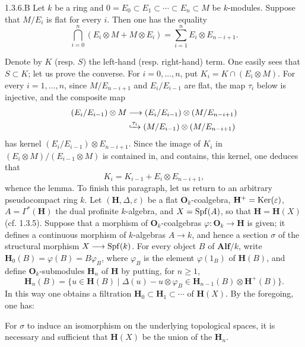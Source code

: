 \begin{lemma}{1.3.6.B}\label{VIIB.1.3.6.B}
Let $k$ be a ring and $0=E_0\subset E_1\subset\cdots\subset E_n\subset M$ be $k$-modules. Suppose that $M/E_i$ is flat for every $i$. Then one has the equality
\[
\bigcap_{i=0}^n(E_i\otimes M+M\otimes E_i)=\sum_{i=1}^n E_i\otimes E_{n-i+1}.
\]
\end{lemma}
Denote by $K$ (resp. $S$) the left-hand (resp. right-hand) term. One easily sees that $S\subset K$; let us prove the converse. For $i=0,\ldots,n$, put $K_i=K\cap(E_i\otimes M)$. For every $i=1,\ldots,n$, since $M/E_{n-i+1}$ and $E_i/E_{i-1}$ are flat, the map $\tau_i$ below is injective, and the composite map
\[
\begin{aligned}
(E_i/E_{i-1})\otimes M&\to(E_i/E_{i-1})\otimes(M/E_{n-i+1})\\
&\lhook\joinrel\xrightarrow{\tau_i}(M/E_{i-1})\otimes(M/E_{n-i+1})
\end{aligned}
\]
has kernel $(E_i/E_{i-1})\otimes E_{n-i+1}$. Since the image of $K_i$ in $(E_i\otimes M)/(E_{i-1}\otimes M)$ is contained in, and contains, this kernel, one deduces that
\[
K_i=K_{i-1}+E_i\otimes E_{n-i+1},
\]
whence the lemma.
To finish this paragraph, let us return to an arbitrary pseudocompact ring $k$. Let $(\mathbf H,\Delta,\varepsilon)$ be a flat $\mathbf O_k$-coalgebra, $\mathbf H^+=\operatorname{Ker}(\varepsilon)$, $A=\Gamma^*(\mathbf H)$ the dual profinite $k$-algebra, and $X=\operatorname{Spf}(A)$, so that $\mathbf H=\mathbf H(X)$ (cf. 1.3.5). Suppose that a morphism of $\mathbf O_k$-coalgebras $\varphi:\mathbf O_k\to\mathbf H$ is given; it defines a continuous morphism of $k$-algebras $A\to k$, and hence a section $\sigma$ of the structural morphism $X\longrightarrow\operatorname{Spf}(k)$.
For every object $B$ of $\mathbf{Alf}/k$, write $\mathbf H_0(B)=\varphi(B)=B\varphi_B$, where $\varphi_B$ is the element $\varphi(1_B)$ of $\mathbf H(B)$, and define $\mathbf O_k$-submodules $\mathbf H_n$ of $\mathbf H$ by putting, for $n\geq1$,
\[
\mathbf H_n(B)=\{u\in\mathbf H(B)\mid\Delta(u)-u\otimes\varphi_B\in\mathbf H_{n-1}(B)\otimes\mathbf H^+(B)\}.
\]
In this way one obtains a filtration $\mathbf H_0\subset\mathbf H_1\subset\cdots$ of $\mathbf H(X)$. By the foregoing, one has:
\begin{proposition}{}
For $\sigma$ to induce an isomorphism on the underlying topological spaces, it is necessary and sufficient that $\mathbf H(X)$ be the union of the $\mathbf H_n$.
\end{proposition}

